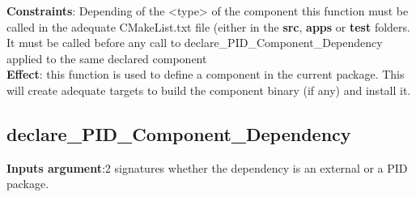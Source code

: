 \documentclass[12pt,a4paper]{article}
\begin{document}
\textbf{Constraints}: Depending of the <type> of the component this function must be called in the adequate CMakeList.txt file (either in the \textbf{src}, \textbf{apps} or \textbf{test} folders. It must be called before any call to declare\_PID\_Component\_Dependency applied to the same declared component\\
\textbf{Effect}: this function is used to define a component in the current package. This will create adequate targets to build the component binary (if any) and install it.

\subsection{declare\_PID\_Component\_Dependency}
\textbf{Inputs argument}:2 signatures whether the dependency is an external or a PID package. 
\end{document}
